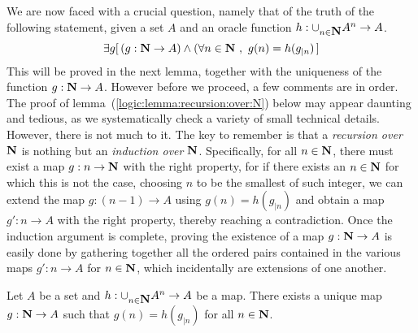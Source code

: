We are now faced with a crucial question, namely that of the truth
of the following statement, given a set $A$ and an oracle function
$h:\cup_{n\in\mbox{$\bf N$}}A^{n}\to A$.
    \[
    \exists g[\,(g:\N\to A)\land(\forall n\in\N\ ,\ g(n)=h(g_{|n})\,]
    \]
This will be proved in the next lemma, together with the uniqueness
of the function $g:\mbox{$\bf N$}\to A$. However before we proceed, a few
comments are in order. The proof of
lemma~(\ref{logic:lemma:recursion:over:N}) below may appear daunting
and tedious, as we systematically check a variety of small technical
details. However, there is not much to it. The key to remember is
that a {\em recursion over $\mbox{$\bf N$}$} is nothing but an {\em induction
over $\mbox{$\bf N$}$}. Specifically, for all $n\in\mbox{$\bf N$}$, there must exist a map
$g:n\to\mbox{$\bf N$}$ with the right property, for if there exists an $n\in\mbox{$\bf N$}$
for which this is not the case, choosing $n$ to be the smallest of
such integer, we can extend the map $g:(n-1)\to A$ using
$g(n)=h(g_{|n})$ and obtain a map $g':n\to A$ with the right
property, thereby reaching a contradiction. Once the induction
argument is complete, proving the existence of a map $g:\mbox{$\bf N$}\to A$ is
easily done by gathering together all the ordered pairs contained in
the various maps $g':n\to A$ for $n\in\mbox{$\bf N$}$, which incidentally are
extensions of one another.
\begin{lemma}\label{logic:lemma:recursion:over:N}
Let $A$ be a set and $h:\cup_{n\in\mbox{$\bf N$}}A^{n}\to A$ be a map. There
exists a unique map $g:\mbox{$\bf N$}\to A$ such that $g(n)=h(g_{|n})$ for all
$n\in\mbox{$\bf N$}$.
\end{lemma}
